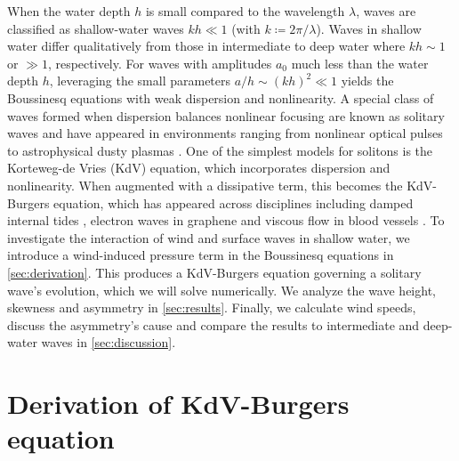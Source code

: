 \documentclass{jfm}
\begin{document}
When the water depth $h$ is small compared to the wavelength $\lambda$,
waves are classified as shallow-water waves $kh \ll 1$ (with $k
\coloneqq 2 \pi/\lambda$).
Waves in shallow water differ qualitatively from those in intermediate
to deep water where $kh \sim 1$ or $\gg 1$, respectively.
For waves with amplitudes $a_0$ much less than the water depth $h$,
leveraging the small parameters $a/h \sim (kh)^2 \ll 1$
yields the Boussinesq equations with weak dispersion and nonlinearity.
A special class of waves formed when dispersion balances nonlinear
focusing are known as solitary waves and have appeared in environments
ranging from nonlinear optical pulses \citep[\eg][]{kivshar1993dark} to
astrophysical dusty plasmas \citep[\eg][]{sahu2012nonextensive}.
One of the simplest models for solitons is the Korteweg-de Vries (KdV)
equation, which incorporates dispersion and nonlinearity.
When augmented with a dissipative term, this becomes the KdV-Burgers
equation, which has appeared across disciplines including damped
internal tides \citep[\eg][]{sandstrom1995dissipation}, electron waves
in graphene \citep[\eg][]{zdyrski2019effects} and viscous flow in blood
vessels \citep[\eg][]{antar1999weakly}.
To investigate the interaction of wind and surface waves in
shallow water, we introduce a wind-induced pressure term in the
Boussinesq equations in \cref{sec:derivation}.
This produces a KdV-Burgers equation governing a solitary wave's
evolution, which we will solve numerically.
We analyze the wave height, skewness and asymmetry in
\cref{sec:results}.
Finally, we calculate wind speeds, discuss the asymmetry's cause and
compare the results to intermediate and deep-water waves in
\cref{sec:discussion}.

\section{\label{sec:derivation} Derivation of KdV-Burgers equation}
\end{document}
